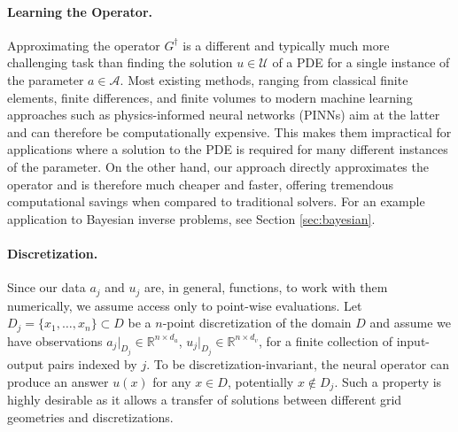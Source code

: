\documentclass{article} %
\newcommand{\R}{\mathbb{R}}
\newcommand{\kamyar}[1]{\textcolor{blue}{{\bf Kamyar:}  #1}}
\newcommand{\A}{\mathcal{A}}
\newcommand{\U}{\mathcal{U}}
\newcommand{\Ftrue}{G^\dagger}
\newcommand{\F}{{G}}
\begin{document}
\paragraph{Learning the Operator.} Approximating the operator \(\Ftrue\) is a different and typically much more challenging task than finding the solution \(u \in \U\) of a PDE for a single instance of the parameter \(a \in \A\). Most existing methods, ranging from classical finite elements, finite differences, and finite volumes to modern machine learning approaches such as physics-informed neural networks (PINNs) \citep{raissi2019physics} aim at the latter and can therefore be computationally expensive. This makes them impractical for applications where a solution to the PDE is required for many different instances of the parameter. On the other hand, our approach directly approximates the operator and is therefore much cheaper and faster, offering tremendous computational savings when compared to traditional solvers. For an example application to Bayesian inverse problems, see Section \ref{sec:bayesian}.





\paragraph{Discretization.} Since our data \(a_j\) and \(u_j\) are, in general, functions, to work with them numerically, we assume access only to point-wise evaluations. 
Let \(D_j = \{x_1,\dots,x_n\} \subset D\) be a \(n\)-point discretization of the domain \(D\) and assume we have observations \(a_j|_{D_j} \in \R^{n \times d_a}\), \(u_j|_{D_j} \in \R^{n\times d_v}\), for a finite collection  of input-output pairs indexed by $j$.
To be discretization-invariant, the neural operator can produce an answer \(u(x)\) for any \(x \in D\), potentially $x \notin D_j$.
Such a property is highly desirable as it allows a transfer of solutions between different grid geometries and discretizations.
\end{document}
